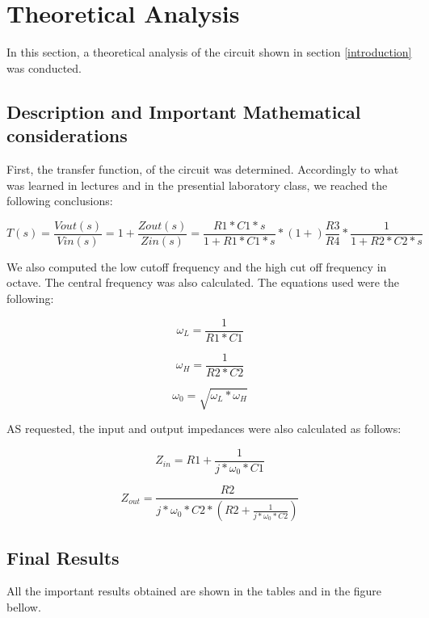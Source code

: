 \section{Theoretical Analysis} \label{section:theo}


\par In this section, a theoretical analysis of the circuit shown in section \ref{introduction} was conducted. 

\subsection{Description and Important Mathematical considerations}

First, the transfer function, of the circuit was determined. Accordingly to what was learned in lectures and in the presential laboratory class, we reached the following conclusions:

\begin{equation}
T(s)= \frac{Vout(s)}{Vin(s)}=1+\frac{Zout(s)}{Zin(s)} = \frac{R1*C1*s}{1+R1*C1*s}*(1+)\frac{R3}{R4}*\frac{1}{1+R2*C2*s}
\end{equation}


We also computed the low cutoff frequency and the high cut off frequency in octave. The central frequency was also calculated. The equations used were the following:


\begin{equation}
\omega_{L}= \frac{1}{R1*C1}
\end{equation}

\begin{equation}
\omega_{H}= \frac{1}{R2*C2}
\end{equation}

\begin{equation}
\omega_{0}= \sqrt{\omega_{L} * \omega_{H}}
\end{equation}

AS requested, the input and output impedances were also calculated as follows:


\begin{equation}
Z_{in}= R1+ \frac{1}{j*\omega_{0}*C1} 
\end{equation}

\begin{equation}
Z_{out}= \frac{R2}{j*\omega_{0}*C2*(R2+\frac{1}{j*\omega_{0}*C2})} 
\end{equation}

\subsection{Final Results}
All the important results obtained are shown in the tables and in the figure bellow. 

